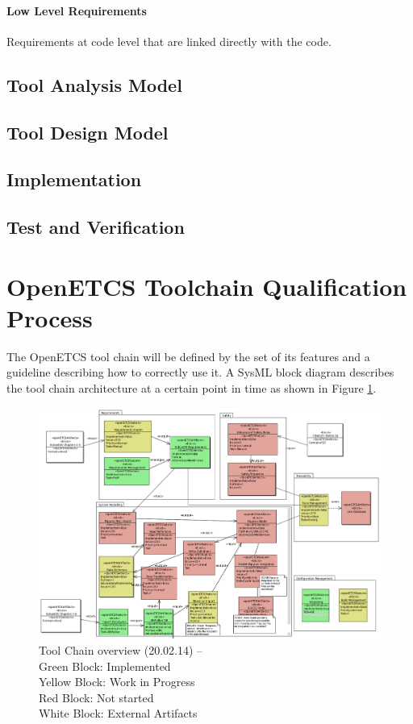 \paragraph{Low Level Requirements}
Requirements at code level that are linked directly with the code.

\subsection{Tool Analysis Model}

\subsection{Tool Design Model}

\subsection{Implementation}

\subsection{Test and Verification}


\section{OpenETCS Toolchain Qualification Process}
\label{sec:toolchain-qualification-process}

The OpenETCS tool chain  will be defined by the set of its features and
a guideline describing how to correctly use it.
A SysML block diagram describes the tool chain architecture at a certain point in time as shown in
Figure \ref{fig:overview}. 
\begin{figure}[htbp]
\includegraphics[width=\textwidth]{ToolChainmodel}
\caption{\label{fig:overview} Tool Chain overview (20.02.14) -- \\
  Green Block: Implemented \\
  Yellow Block: Work in Progress \\
  Red Block: Not started \\
  White Block: External Artifacts} 
\end{figure}

